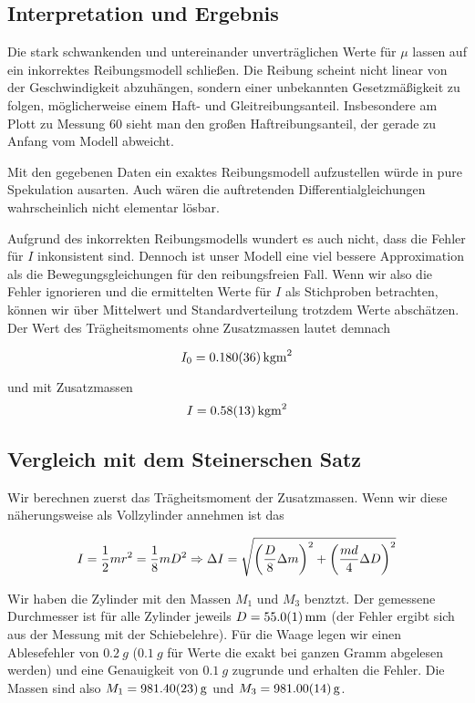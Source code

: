\documentclass[a4paper,german,12pt,smallheadings]{scrartcl}
\begin{document}


\subsection*{Interpretation und Ergebnis}
Die stark schwankenden und untereinander unverträglichen Werte für $\mu$ lassen
auf ein inkorrektes Reibungsmodell schließen. Die Reibung scheint nicht linear
von der Geschwindigkeit abzuhängen, sondern einer unbekannten Gesetzmäßigkeit
zu folgen, möglicherweise einem Haft- und Gleitreibungsanteil. Insbesondere am
Plott zu Messung 60 sieht man den großen Haftreibungsanteil, der gerade zu
Anfang vom Modell abweicht.

Mit den gegebenen Daten ein exaktes Reibungsmodell aufzustellen würde in pure
Spekulation ausarten. Auch wären die auftretenden Differentialgleichungen
wahrscheinlich nicht elementar lösbar.

Aufgrund des inkorrekten Reibungsmodells wundert es auch nicht, dass die Fehler
für $I$ inkonsistent sind. Dennoch ist unser Modell eine viel bessere
Approximation als die Bewegungsgleichungen für den reibungsfreien Fall. Wenn
wir also die Fehler ignorieren und die ermittelten Werte für $I$ als
Stichproben betrachten, können wir über Mittelwert und Standardverteilung
trotzdem Werte abschätzen. Der Wert des Trägheitsmoments ohne Zusatzmassen
lautet demnach

\begin{equation}
  I_0 = \SI{0.180+-0.036}{kg m^2}
\end{equation}

und mit Zusatzmassen
\begin{equation}
  I = \SI{0.58+-0.13}{kg m^2}
\end{equation}

\subsection*{Vergleich mit dem Steinerschen Satz}
Wir berechnen zuerst das Trägheitsmoment der Zusatzmassen. Wenn wir diese
näherungsweise als Vollzylinder annehmen ist das

\begin{equation}
  I = \frac{1}{2} m r^2 = \frac{1}{8} mD^2 \Rightarrow
  \Delta I = \sqrt{\del{\frac{D}{8} \Delta m}^2 + \del{\frac{md}{4} \Delta D}^2}
\end{equation}

Wir haben die Zylinder mit den Massen $M_1$ und $M_3$ benztzt. Der gemessene
Durchmesser ist für alle Zylinder jeweils $D = \SI{55.0+-0.1}{mm}$ (der Fehler
ergibt sich aus der Messung mit der Schiebelehre). Für die Waage legen wir
einen Ablesefehler von $\SI{0.2}{g}$ ($\SI{0.1}{g}$ für Werte die exakt bei
ganzen Gramm abgelesen werden) und eine Genauigkeit von $\SI{0.1}{g}$ zugrunde
und erhalten die Fehler. Die Massen sind also $M_1 = \SI{981.4+-0.23}{g}$ und $M_3 =
\SI{981.0+-0.14}{g}$.
\end{document}
